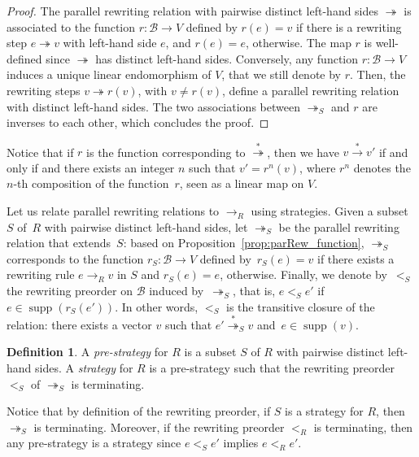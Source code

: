 \documentclass[10pt]{easychair}
\theoremstyle{definition}
\newtheorem{definition}[theorem]{Definition}
\DeclareMathOperator{\supp}{supp}
\newcommand\basis{\mathscr{B}}
\newcommand\ordS{<_S}
\newcommand\rewR{\to_R}
\newcommand\parRew{\twoheadrightarrow}
\newcommand\parS{\twoheadrightarrow_S}
\newcommand\transRew{\overset{*}{\to}}
\newcommand\transParS{\overset{*}{\twoheadrightarrow}_S}
\newcommand\transParRew{\overset{*}{\twoheadrightarrow}}
\begin{document}
\begin{proof}
  The parallel rewriting relation with pairwise distinct left-hand sides
  $\parRew$ is associated to the function $r:\basis\to V$ defined by
  $r(e)=v$ if there is a rewriting step $e\parRew v$ with left-hand side
  $e$, and $r(e)=e$, otherwise. The map $r$ is well-defined since
  $\parRew$ has distinct left-hand sides. Conversely, any function 
  $r:\basis\to V$ induces a unique linear endomorphism of $V$, that we
  still denote by $r$. Then, the rewriting steps $v\parRew r(v)$, with
  $v\neq r(v)$, define a parallel rewriting relation with distinct
  left-hand sides. The two associations between $\parS$ and $r$ are
  inverses to each other, which concludes the proof. 
\end{proof}

Notice that if $r$ is the function corresponding to $\transParRew$, then
we have $v\transRew v'$ if and only if and there exists an integer $n$
such that $v'=r^n(v)$, where $r^n$ denotes the $n$-th composition of the
function~$r$, seen as a linear map on $V$. 
\medskip

Let us relate parallel rewriting relations to $\rewR$ using strategies.
Given a subset~$S$ of~$R$ with pairwise distinct left-hand sides, let
$\parS$ be the parallel rewriting relation that extends~$S$: based on 
Proposition~\ref{prop:parRew_function}, $\parS$ corresponds to the
function $r_S:\basis\to V$ defined by~$r_S(e)=v$ if there exists a
rewriting rule $e\rewR v$ in $S$ and $r_S(e)=e$, otherwise. Finally, we
denote by~$\ordS$ the rewriting preorder on $\basis$ induced by~$\parS$,
that is, $e\ordS e'$ if $e\in\supp(r_S(e'))$. In other words, $\ordS$ is
the transitive closure of the relation: there exists a vector $v$ such
that $e'\transParS v$ and~$e\in\supp(v)$.
\smallskip

\begin{definition}\label{def:strategies}
  A {\em pre-strategy} for $R$ is a subset $S$ of $R$ with pairwise
  distinct left-hand sides. A {\em strategy} for $R$ is a pre-strategy
  such that the rewriting preorder $\ordS$ of $\parS$ is terminating. 
\end{definition}
\smallskip

Notice that by definition of the rewriting preorder, if $S$ is a strategy
for $R$, then $\parS$ is terminating. Moreover, if the rewriting preorder
$<_R$ is terminating, then any pre-strategy is a strategy since
$e\ordS e'$ implies $e<_Re'$.
\smallskip
\end{document}
